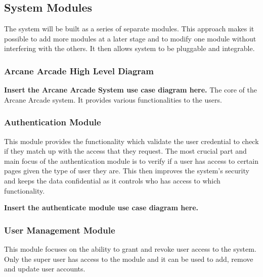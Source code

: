 \documentclass[english]{article}
\begin{document}
		\newpage
		\subsection{System Modules}
		The system will be built as a series of separate modules. This approach makes it possible to add more modules at a later stage and to modify one module without interfering with the others. It then allows system to be pluggable and integrable.
		\subsubsection{Arcane Arcade High Level Diagram}
		\textbf{Insert the Arcane Arcade System use case diagram here.} \newline
		The core of the Arcane Arcade system. It provides various functionalities to the users.
		\subsubsection{Authentication Module}
		This module provides the functionality which validate the user credential to check if they match up with the access that they request. The most crucial part and main focus of the authentication module is to verify if a user has access to certain pages given the type of user they are. This then improves the system's security and keeps the data confidential as it controls who has access to which functionality.
		
		\textbf{Insert the authenticate module use case diagram here.} \newline

		\subsubsection{User Management Module}
		This module focuses on the ability to grant and revoke user access to the system. Only the super user has access to the module and it can be used to add, remove and update user accounts.
		
\end{document}
